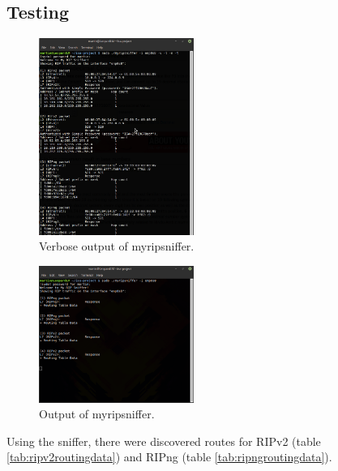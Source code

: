 \documentclass[10pt,a4paper,titlepage]{article}
\begin{document}
        \newpage
        \subsection{Testing}

            \begin{figure}[h!]
                \begin{center}
                    \includegraphics[width=0.45\textwidth]{snifferoutput.png}
                    \caption{Verbose output of myripsniffer. \label{fig:MyRipSniffer}}
                \end{center}
            \end{figure}

            \begin{figure}[h!]
                \begin{center}
                    \includegraphics[width=0.45\textwidth]{snifferoutputbrief.png}
                    \caption{Output of myripsniffer. \label{fig:MyRipSnifferBrief}}
                \end{center}
            \end{figure}

            Using the sniffer, there were discovered routes for RIPv2 (table \ref{tab:ripv2routingdata})
            and RIPng (table \ref{tab:ripngroutingdata}).
\end{document}
